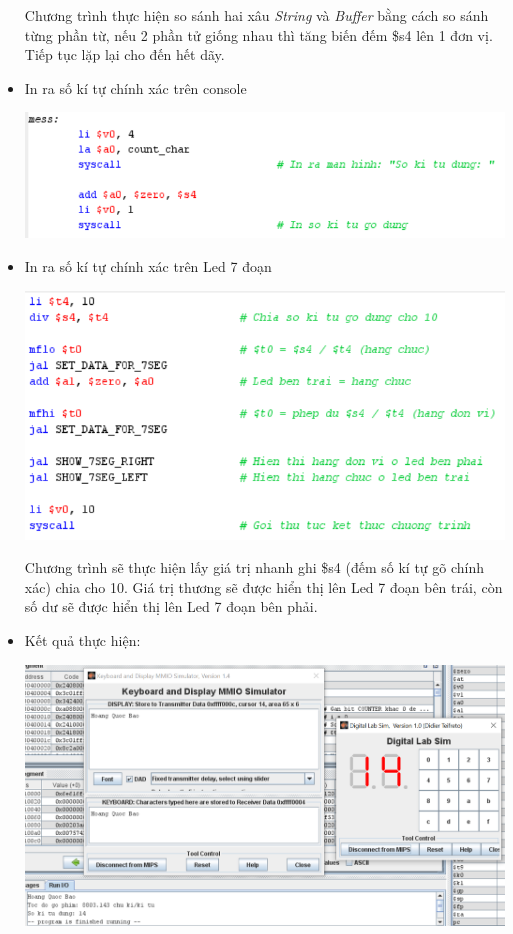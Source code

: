 \documentclass[12pt,a4paper,oneside]{article}
\begin{document}
\begin{itemize}
\begin{center}
\end{center}
Chương trình thực hiện so sánh hai xâu \textit{String} và \textit{Buffer} bằng cách so sánh từng phần từ, nếu 2 phần tử giống nhau thì tăng biến đếm \$s4 lên 1 đơn vị. Tiếp tục lặp lại cho đến hết dãy.
\item In ra số kí tự chính xác trên console
\begin{center}
\includegraphics[scale=1]{image/b41}
\end{center}
\item In ra số kí tự chính xác trên Led 7 đoạn
\begin{center}
\includegraphics[scale=1]{image/b42}
\end{center}
Chương trình sẽ thực hiện lấy giá trị nhanh ghi \$s4 (đếm số kí tự gõ chính xác) chia cho 10. Giá trị thương sẽ được hiển thị lên  Led 7 đoạn bên trái, còn số dư sẽ được hiển thị lên Led 7 đoạn bên phải.
\pagebreak
\item Kết quả thực hiện:
\begin{center}
\includegraphics[scale=0.6]{image/b43}
\end{center}
\end{itemize}
\end{document}
